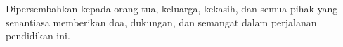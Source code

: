 
{}

\vspace*{\fill}

\begin{center}
    \begin{minipage}{0.82\textwidth}
        \centering
        \itshape

        Dipersembahkan kepada orang tua, keluarga, kekasih, dan semua pihak
        yang senantiasa memberikan doa, dukungan, dan semangat
        dalam perjalanan pendidikan ini.
    \end{minipage}
\end{center}

\vspace*{\fill}